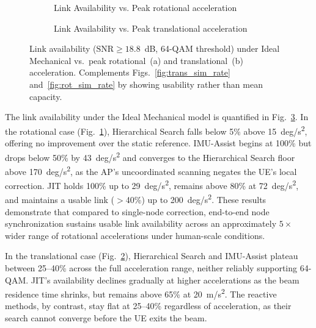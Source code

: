 \documentclass[fleqn,10pt]{wlscirep}
\begin{document}
\begin{figure}[h!]
    \centering
    \begin{subfigure}{0.495\linewidth}
        
        \vspace{-25pt}
        \caption{Link Availability vs. Peak rotational acceleration}
        \label{fig:rotionalLinkAvail}
    \end{subfigure}
    \hfill
    \begin{subfigure}{0.495\linewidth}
        
        \vspace{-25pt}
        \caption{Link Availability vs. Peak translational acceleration}
        \label{fig:translationalLinkAvail}
    \end{subfigure}
    \caption{Link availability ($\mathrm{SNR} \geq 18.8$~dB, 64-QAM threshold) under Ideal Mechanical vs.\ peak rotational~(a) and translational~(b) acceleration. Complements Figs.~\ref{fig:trans_sim_rate} and~\ref{fig:rot_sim_rate} by showing usability rather than mean capacity.}
    \label{fig:accelLinkAvail}
    \vspace{-5pt}
\end{figure}

The link availability under the Ideal Mechanical model is quantified in Fig.~\ref{fig:accelLinkAvail}. In the rotational case (Fig.~\ref{fig:rotionalLinkAvail}), Hierarchical Search falls below 5\% above \SI{15}{deg/s^2}, offering no improvement over the static reference. IMU-Assist begins at 100\% but drops below 50\% by \SI{43}{deg/s^2} and converges to the Hierarchical Search floor above \SI{170}{deg/s^2}, as the AP's uncoordinated scanning negates the UE's local correction. JIT holds 100\% up to \SI{29}{deg/s^2}, remains above 80\% at \SI{72}{deg/s^2}, and maintains a usable link ($>$40\%) up to \SI{200}{deg/s^2}. These results demonstrate that compared to single-node correction, end-to-end node synchronization sustains usable link availability across an approximately $5\times$ wider range of rotational accelerations under human-scale conditions.

In the translational case (Fig.~\ref{fig:translationalLinkAvail}), Hierarchical Search and IMU-Assist plateau between 25--40\% across the full acceleration range, neither reliably supporting 64-QAM. JIT's availability declines gradually at higher accelerations as the beam residence time shrinks, but remains above 65\% at \SI{20}{m/s^2}. The reactive methods, by contrast, stay flat at 25--40\% regardless of acceleration, as their search cannot converge before the UE exits the beam.
\end{document}

